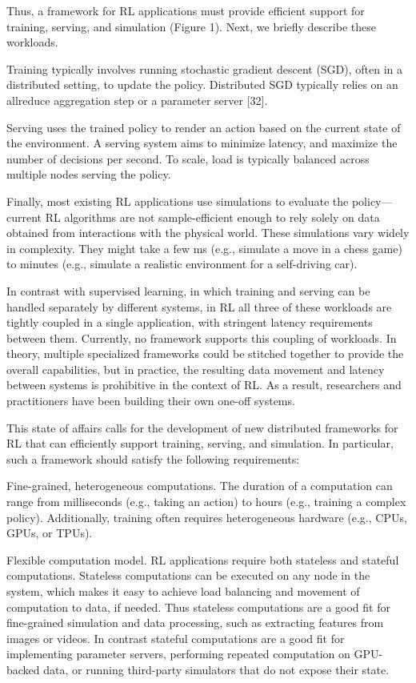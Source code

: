 \documentclass[
]{article}
\begin{document}
Thus, a framework for RL applications must provide efficient support for
training, serving, and simulation (Figure 1). Next, we briefly describe
these workloads.

Training typically involves running stochastic gradient descent (SGD),
often in a distributed setting, to update the policy. Distributed SGD
typically relies on an allreduce aggregation step or a parameter server
{[}32{]}.

Serving uses the trained policy to render an action based on the current
state of the environment. A serving system aims to minimize latency, and
maximize the number of decisions per second. To scale, load is typically
balanced across multiple nodes serving the policy.

Finally, most existing RL applications use simulations to evaluate the
policy---current RL algorithms are not sample-efficient enough to rely
solely on data obtained from interactions with the physical world. These
simulations vary widely in complexity. They might take a few ms (e.g.,
simulate a move in a chess game) to minutes (e.g., simulate a realistic
environment for a self-driving car).

In contrast with supervised learning, in which training and serving can
be handled separately by different systems, in RL all three of these
workloads are tightly coupled in a single application, with stringent
latency requirements between them. Currently, no framework supports this
coupling of workloads. In theory, multiple specialized frameworks could
be stitched together to provide the overall capabilities, but in
practice, the resulting data movement and latency between systems is
prohibitive in the context of RL. As a result, researchers and
practitioners have been building their own one-off systems.

This state of affairs calls for the development of new distributed
frameworks for RL that can efficiently support training, serving, and
simulation. In particular, such a framework should satisfy the following
requirements:

Fine-grained, heterogeneous computations. The duration of a computation
can range from milliseconds (e.g., taking an action) to hours (e.g.,
training a complex policy). Additionally, training often requires
heterogeneous hardware (e.g., CPUs, GPUs, or TPUs).

Flexible computation model. RL applications require both stateless and
stateful computations. Stateless computations can be executed on any
node in the system, which makes it easy to achieve load balancing and
movement of computation to data, if needed. Thus stateless computations
are a good fit for fine-grained simulation and data processing, such as
extracting features from images or videos. In contrast stateful
computations are a good fit for implementing parameter servers,
performing repeated computation on GPU-backed data, or running
third-party simulators that do not expose their state.
\end{document}
